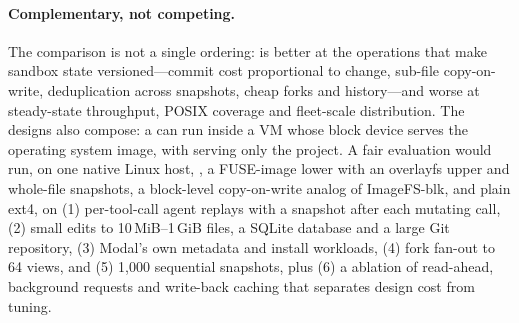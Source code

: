 \paragraph{Complementary, not competing.} The comparison is not a single ordering:
\sys{} is better at the operations that make sandbox state versioned---commit cost
proportional to change, sub-file copy-on-write, deduplication across snapshots, cheap
forks and history---and worse at steady-state throughput, POSIX coverage and fleet-scale
distribution. The designs also compose: a \sys{} \ws{} can run inside a VM whose block
device serves the operating system image, with \sys{} serving only the project. A fair
evaluation would run, on one native Linux host, \sys{}, a FUSE-image lower with an
overlayfs upper and whole-file snapshots, a block-level copy-on-write analog of
ImageFS-blk, and plain ext4, on (1) per-tool-call agent replays with a snapshot after
each mutating call, (2) small edits to 10\,MiB--1\,GiB files, a SQLite database and a
large Git repository, (3) Modal's own metadata and install workloads, (4) fork fan-out
to 64 views, and (5) 1,000 sequential snapshots, plus (6) a \sys{} ablation of
read-ahead, background requests and write-back caching that separates design cost from
tuning.

